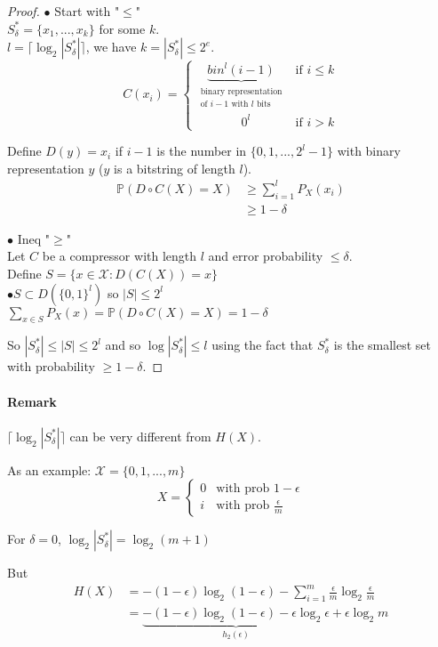 \begin{proof}
$\bullet$ Start with "$\leq$"\\
$S_\delta^*=\{x_1,...,x_k\}$ for some $k$.\\
$l=\lceil \log_2 |S_\delta^* | \rceil$, we have $k=|S_\delta^*|\leq 2^e$.
\[C(x_i)=
\begin{cases}
\underbrace{bin^l(i-1)}_{\substack{\text{binary representation}\\ \text{of $i-1$ with $l$ bits}}} & \text{if $i\leq k$}\\
\qquad \quad \; \; 0^l & \text{if $i>k$}
\end{cases}\]

Define $D(y)=x_i$ if $i-1$ is the number in $\{0,1,...,2^l-1\}$ with binary representation $y$ ($y$ is a bitstring of length $l$).
\begin{align*}
\mathbb{P}(D\circ C(X)=X) & \geq \sum_{i=1}^{l}P_X(x_i)\\
& \geq 1-\delta
\end{align*}

$\bullet$ Ineq "$\geq$"\\
Let $C$ be a compressor with length $l$ and error probability $\leq \delta$.\\
Define $S=\{ x\in \mathcal{X}:D(C(X))=x \}$\\
$\bullet S\subset D(\{0,1\}^l)$ so $|S|\leq 2^l$\\
$\sum_{x\in S} P_X(x)=\mathbb{P}(D\circ C(X)=X)=1-\delta$

So $|S_\delta^*|\leq |S| \leq 2^l $ and so $\log |S_\delta^*|\leq l$ using the fact that $S_\delta^*$ is the smallest set with probability $\geq 1 - \delta$.
\end{proof}

\paragraph{Remark} $\lceil \log_2 |S_\delta^* | \rceil$ can be very different from $H(X)$.

As an example: $\mathcal{X}=\{0,1,...,m\}$
\[
X=\begin{cases}
0 & \text{with prob $1-\epsilon$}\\
i & \text{with prob $\frac{\epsilon}{m}$}
\end{cases}
\]

For $\delta=0$, $\log_2 |S_\delta^* | = \log_2 (m+1)$

But \begin{align*}
H(X) & = -(1-\epsilon)\log_2 (1-\epsilon) - \sum_{i=1}^{m}\frac{\epsilon}{m}\log_2\frac{\epsilon}{m}\\
& = \underbrace{ -(1-\epsilon )\log_2(1-\epsilon )-\epsilon\log_2 \epsilon}_{h_2(\epsilon)}+ \epsilon \log_2 m
\end{align*}

